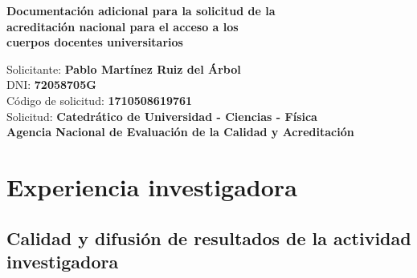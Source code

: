 \documentclass[a4paper, 11pt, twoside, openright]{report}
\begin{document}

\begin{titlepage}

	\vspace*{5.5cm}
	\centering

	{\huge\bfseries Documentación adicional para la solicitud de la \\ \vspace*{1cm}
	                acreditación nacional para el acceso a los\\ \vspace*{1cm}
                        cuerpos docentes universitarios}
	
	\begin{flushleft}
	
	\vspace{6.6cm}
	{\Large Solicitante: \textbf{Pablo Martínez Ruiz del Árbol}\\}
	{\Large DNI: \textbf{72058705G}\\}
	{\Large Código de solicitud: \textbf{1710508619761}\\}
	{\Large Solicitud: \textbf{Catedrático de Universidad - Ciencias - Física}\\}
	{\Large \textbf{Agencia Nacional de Evaluación de la Calidad y Acreditación}}
	\vfill
	
	\end{flushleft}

\end{titlepage}

\tableofcontents
\clearpage
\thispagestyle{empty}
\phantom{a}
\vfill
\newpage


\setcounter{page}{1}

\renewcommand\thechapter{\arabic{chapter}}
\renewcommand\thesection{\thechapter.\Alph{section}}
\renewcommand\thesubsection{\thesection.\arabic{subsection}}
\renewcommand\thesubsubsection{\thesubsection.\arabic{subsubsection}}

\chapter{Experiencia investigadora}

\section{Calidad y difusión de resultados de la actividad investigadora}
\end{document}
